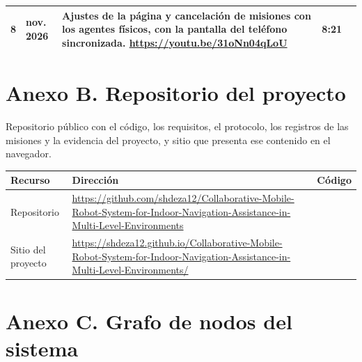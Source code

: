 \begin{table}[H]
\begin{tabular}{@{}c >{\raggedright\arraybackslash}p{} p{} c c@{}}
    8 & 1 nov. 2026 & Ajustes de la página y cancelación de misiones con los agentes físicos, con la pantalla del teléfono sincronizada. \newline \url{https://youtu.be/31oNn04qLoU} & 8:21 & \raisebox{-0.85\height}{\qrcode[height=1.25cm]{https://youtu.be/31oNn04qLoU}} \\ \bottomrule
  \end{tabular}
\end{table}

\chapter*{Anexo B. Repositorio del proyecto}

Repositorio público con el código, los requisitos, el protocolo, los registros de las misiones y la evidencia del proyecto, y sitio que presenta ese contenido en el navegador.

\begin{table}[H]
  \centering\small
  \renewcommand{\arraystretch}{1.3}
  \begin{tabular}{@{}p{} p{} c@{}}
    \toprule
    \textbf{Recurso} & \textbf{Dirección} & \textbf{Código} \\ \midrule
    Repositorio & \url{https://github.com/shdeza12/Collaborative-Mobile-Robot-System-for-Indoor-Navigation-Assistance-in-Multi-Level-Environments} & \raisebox{-0.85\height}{\qrcode[height=2cm]{https://github.com/shdeza12/Collaborative-Mobile-Robot-System-for-Indoor-Navigation-Assistance-in-Multi-Level-Environments}} \\ \addlinespace
    Sitio del proyecto & \url{https://shdeza12.github.io/Collaborative-Mobile-Robot-System-for-Indoor-Navigation-Assistance-in-Multi-Level-Environments/} & \raisebox{-0.85\height}{\qrcode[height=2cm]{https://shdeza12.github.io/Collaborative-Mobile-Robot-System-for-Indoor-Navigation-Assistance-in-Multi-Level-Environments/}} \\ \bottomrule
  \end{tabular}
\end{table}

\chapter*{Anexo C. Grafo de nodos del sistema}

